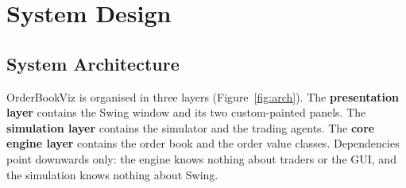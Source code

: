 \documentclass[12pt,a4paper,openany,oneside]{report}
\newcommand{\projectTitle}{OrderBookViz}
\begin{document}
\chapter{System Design}

\section{System Architecture}

\projectTitle{} is organised in three layers (Figure~\ref{fig:arch}). The \textbf{presentation layer} contains the Swing window and its two custom-painted panels. The \textbf{simulation layer} contains the simulator and the trading agents. The \textbf{core engine layer} contains the order book and the order value classes. Dependencies point downwards only: the engine knows nothing about traders or the GUI, and the simulation knows nothing about Swing.
\end{document}
